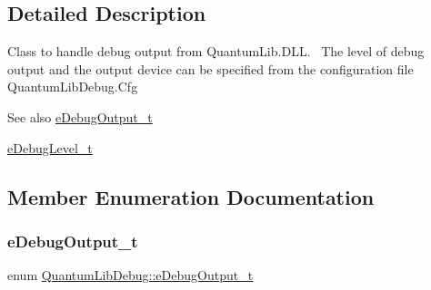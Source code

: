 \subsection{Detailed Description}
Class to handle debug output from Quantum\+Lib.\+D\+LL.~\newline
The level of debug output and the output device can be specified from the configuration file Quantum\+Lib\+Debug.\+Cfg~\newline
\begin{DoxySeeAlso}{See also}
\mbox{\hyperlink{class_quantum_lib_debug_a02246b73828eeaee6859743af47523c7}{e\+Debug\+Output\+\_\+t}} 

\mbox{\hyperlink{_quantum_lib_debug_8h_a2f13c7df267567b446dbccb2746149f3}{e\+Debug\+Level\+\_\+t}} 
\end{DoxySeeAlso}


\subsection{Member Enumeration Documentation}
\mbox{\label{class_quantum_lib_debug_a02246b73828eeaee6859743af47523c7}} 
\subsubsection{\texorpdfstring{e\+Debug\+Output\+\_\+t}{eDebugOutput\_t}}
{\footnotesize\ttfamily enum \mbox{\hyperlink{class_quantum_lib_debug_a02246b73828eeaee6859743af47523c7}{Quantum\+Lib\+Debug\+::e\+Debug\+Output\+\_\+t}}}

